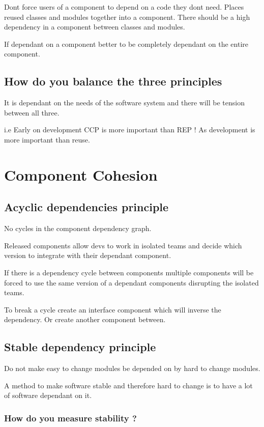 \documentclass[11pt]{scrartcl} %
\begin{document}
Dont force users of a component to depend on a code they dont need.
Places reused classes and modules together into a component. There
should be a high dependency in a component between classes and modules.

If dependant on a component better to be completely dependant on the
entire component.

\subsection{How do you balance the three principles}

It is dependant on the needs of the software system and there will be
tension between all three.

i.e Early on development CCP is more important than REP ! As development
is more important than reuse.

\section{Component Cohesion}

\subsection{Acyclic dependencies principle}

No cycles in the component dependency graph.

Released components allow devs to work in isolated teams and decide
which version to integrate with their dependant component.

If there is a dependency cycle between components multiple components
will be forced to use the same version of a dependant components
disrupting the isolated teams.

To break a cycle create an interface component which will inverse the
dependency. Or create another component between.

\subsection{Stable dependency principle}

Do not make easy to change modules be depended on by hard to change
modules.

A method to make software stable and therefore hard to change is to have
a lot of software dependant on it.

\subsubsection{How do you measure stability ?}
\end{document}
